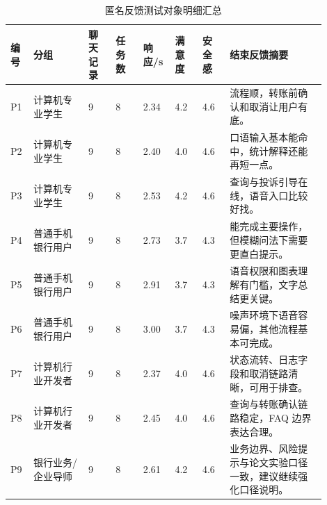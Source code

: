 \documentclass[bachelor, print]{xduthesis}
\begin{document}
\begin{appendix}
\begin{table}[H]
    \centering
    \caption{匿名反馈测试对象明细汇总}
    \label{tab:usability-participant-appendix}
    \scriptsize
    \setlength{\tabcolsep}{2pt}
    \begin{tabular}{|p{0.06\linewidth}|p{0.16\linewidth}|p{0.08\linewidth}|p{0.08\linewidth}|p{0.08\linewidth}|p{0.08\linewidth}|p{0.08\linewidth}|p{0.28\linewidth}|}
        \hline
        编号 & 分组 & 聊天记录 & 任务数 & 响应/s & 满意度 & 安全感 & 结束反馈摘要 \\
        \hline
        P1 & 计算机专业学生 & 9 & 8 & 2.34 & 4.2 & 4.6 & 流程顺，转账前确认和取消让用户有底。 \\
        \hline
        P2 & 计算机专业学生 & 9 & 8 & 2.40 & 4.0 & 4.6 & 口语输入基本能命中，统计解释还能再短一点。 \\
        \hline
        P3 & 计算机专业学生 & 9 & 8 & 2.53 & 4.2 & 4.6 & 查询与投诉引导在线，语音入口比较好找。 \\
        \hline
        P4 & 普通手机银行用户 & 9 & 8 & 2.73 & 3.7 & 4.3 & 能完成主要操作，但模糊问法下需要更直白提示。 \\
        \hline
        P5 & 普通手机银行用户 & 9 & 8 & 2.91 & 3.7 & 4.3 & 语音权限和图表理解有门槛，文字总结更关键。 \\
        \hline
        P6 & 普通手机银行用户 & 9 & 8 & 3.00 & 3.7 & 4.3 & 噪声环境下语音容易偏，其他流程基本可完成。 \\
        \hline
        P7 & 计算机行业开发者 & 9 & 8 & 2.37 & 4.0 & 4.6 & 状态流转、日志字段和取消链路清晰，可用于排查。 \\
        \hline
        P8 & 计算机行业开发者 & 9 & 8 & 2.45 & 4.0 & 4.6 & 查询与转账确认链路稳定，FAQ 边界表达合理。 \\
        \hline
        P9 & 银行业务/企业导师 & 9 & 8 & 2.61 & 4.2 & 4.6 & 业务边界、风险提示与论文实验口径一致，建议继续强化口径说明。 \\
        \hline
    \end{tabular}
\end{table}


\end{appendix}
\end{document}
